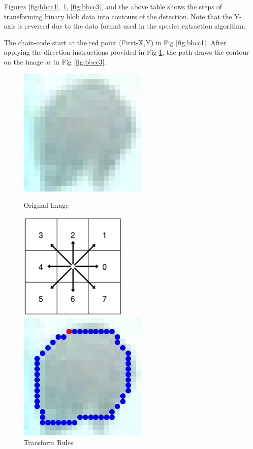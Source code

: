 \documentclass[bsc,frontabs,twoside,fullspacing,parskip,deptreport]{infthesis}
\begin{document}
Figures \ref{fig:bbcc1}, \ref{fig:bbcc2}, \ref{fig:bbcc3}, and the above table shows the steps of transforming binary blob data into contours of the detection.
Note that the Y-axis is reversed due to the data format used in the species extraction algorithm. 

The chain-code start at the red point (First-X,Y) in Fig \ref{fig:bbcc1}. 
After applying the direction instructions provided in Fig \ref{fig:bbcc2}, the path draws the contour on the image as in Fig \ref{fig:bbcc3}.

\vspace{-10pt}
\hspace{-40pt}

\begin{figure}[!ht]
	\begin{minipage}[t]{0.3 \linewidth}
		\centering
		\includegraphics[scale=0.3]{graph/bbcc.png}
		\caption{\footnotesize Original Image}
		\label{fig:bbcc1}
	\end{minipage}
	\begin{minipage}[t]{0.35 \linewidth}
		\centering
		\includegraphics[scale=0.4]{graph/bbcctrans.png}
		\caption{ \footnotesize Transform Rules\cite{bbcc}}
		\label{fig:bbcc2}
	\end{minipage}
	\begin{minipage}[t]{0.3 \linewidth}
		\centering
		\includegraphics[scale=0.3]{graph/bbccaplied.png}

\end{minipage}
\end{figure}
\end{document}
